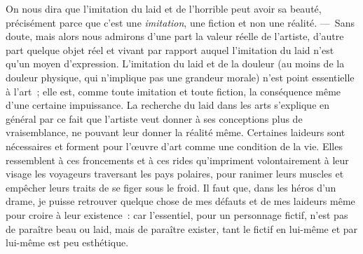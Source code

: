 \documentclass[french,twoside]{book} %
\begin{document}
On nous dira que l’imitation du laid et de l’horrible peut avoir sa beauté, précisément parce que c’est une \emph{imitation}, une fiction et non une réalité. — Sans doute, mais alors nous admirons d’une part la valeur réelle de l’artiste, d’autre part quelque objet réel et vivant par rapport auquel l’imitation du laid n’est qu’un moyen d’expression. L’imitation du laid et de la douleur (au moins de la douleur physique, qui n’implique pas une grandeur morale) n’est point essentielle à l’art ; elle est, comme toute imitation et toute fiction, la conséquence même d’une certaine impuissance. La recherche du laid dans les arts s’explique en général par ce fait que l’artiste veut donner à ses conceptions plus de vraisemblance, ne pouvant leur donner la réalité même. Certaines laideurs sont nécessaires et forment pour l’œuvre d’art comme une condition de la vie. Elles ressemblent à ces froncements et à ces rides qu’impriment volontairement à leur visage les voyageurs traversant les pays polaires, pour ranimer leurs muscles et empêcher leurs traits de se figer sous le froid. Il faut que, dans les héros d’un drame, je puisse retrouver quelque chose de mes défauts et de mes laideurs même pour croire à leur existence : car l’essentiel, pour un personnage fictif, n’est pas de paraître beau ou laid, mais  de paraître exister, tant le fictif en lui-même et par lui-même est peu esthétique.\par
\end{document}
